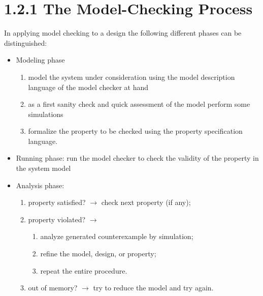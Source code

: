 \documentclass[a4paper,12pt]{article}
\begin{document}
\section*{1.2.1 The Model-Checking Process}

In applying model checking to a design the following diﬀerent phases can be distinguished:
\begin{itemize}
	\item Modeling phase  
	\begin{enumerate}[-]
		\item model the system under consideration using the model description language of the model checker at hand
		\item as a ﬁrst sanity check and quick assessment 
		of the model perform some simulations
		\item formalize the property to be 
		checked using the property speciﬁcation language.
	\end{enumerate}
	\item Running phase: run the model checker to check the validity of the property in the system 
	model
	\item Analysis phase:
	\begin{enumerate}[-]
		\item property satisﬁed? $\rightarrow$ check next property (if any); 
		\item property violated? $\rightarrow$
		\begin{enumerate}[1.]
			\item analyze generated counterexample by simulation; 
			\item reﬁne the model, design, or property;
			\item repeat the entire procedure.
		\end{enumerate}
		\item out of memory? $\rightarrow$ try to reduce the model and try again.
	\end{enumerate}
\end{itemize}
\end{document}
